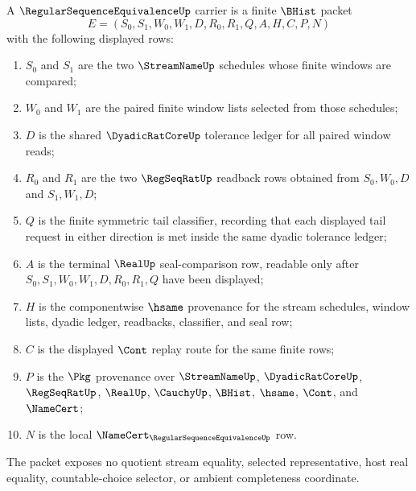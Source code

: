 \begin{definition}
\label{def:regular-sequence-equivalence-namecert-surface}
A $\RegularSequenceEquivalenceUp$ carrier is a finite $\BHist$ packet
$$
E=(S_0,S_1,W_0,W_1,D,R_0,R_1,Q,A,H,C,P,N)
$$
with the following displayed rows:
\begin{enumerate}
\item $S_0$ and $S_1$ are the two $\StreamNameUp$ schedules whose finite windows are compared;
\item $W_0$ and $W_1$ are the paired finite window lists selected from those schedules;
\item $D$ is the shared $\DyadicRatCoreUp$ tolerance ledger for all paired window reads;
\item $R_0$ and $R_1$ are the two $\RegSeqRatUp$ readback rows obtained from $S_0,W_0,D$ and $S_1,W_1,D$;
\item $Q$ is the finite symmetric tail classifier, recording that each displayed tail request in either direction is met inside the same dyadic tolerance ledger;
\item $A$ is the terminal $\RealUp$ seal-comparison row, readable only after $S_0,S_1,W_0,W_1,D,R_0,R_1,Q$ have been displayed;
\item $H$ is the componentwise $\hsame$ provenance for the stream schedules, window lists, dyadic ledger, readbacks, classifier, and seal row;
\item $C$ is the displayed $\Cont$ replay route for the same finite rows;
\item $P$ is the $\Pkg$ provenance over $\StreamNameUp$, $\DyadicRatCoreUp$, $\RegSeqRatUp$, $\RealUp$, $\CauchyUp$, $\BHist$, $\hsame$, $\Cont$, and $\NameCert$;
\item $N$ is the local $\NameCert_{\RegularSequenceEquivalenceUp}$ row.
\end{enumerate}
The packet exposes no quotient stream equality, selected representative, host real equality, countable-choice selector, or ambient completeness coordinate.
\end{definition}

